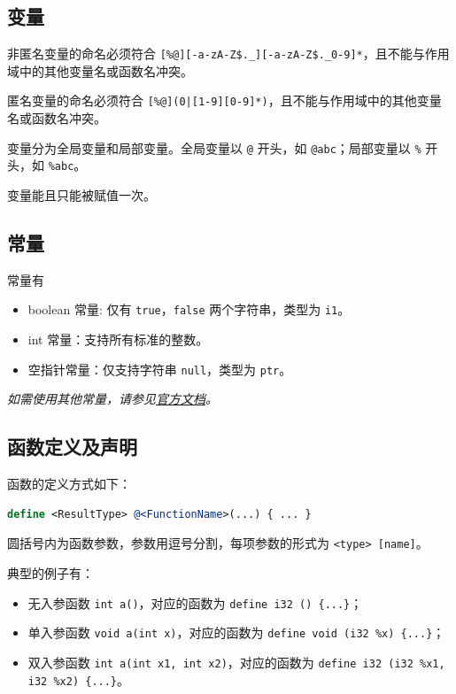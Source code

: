 \subsection{变量}\label{LLVM-variables}

非匿名变量的命名必须符合 \texttt{[\%@][-a-zA-Z\$.\_][-a-zA-Z\$.\_0-9]*}，且不能与作用域中的其他变量名或函数名冲突。

匿名变量的命名必须符合 \texttt{[\%@](0|[1-9][0-9]*)}，且不能与作用域中的其他变量名或函数名冲突。

变量分为全局变量和局部变量。全局变量以 \texttt @ 开头，如 \texttt{@abc}；局部变量以 \texttt \% 开头，如 \texttt{\%abc}。

变量能且只能被赋值一次。

\subsection{常量}\label{LLVM-constants}

常量有
\begin{itemize}
  \item boolean 常量: 仅有 \texttt{true}，\texttt{false} 两个字符串，类型为 \texttt{i1}。
  \item int 常量：支持所有标准的整数。
  \item 空指针常量：仅支持字符串 \texttt{null}，类型为 \texttt{ptr}。
\end{itemize}

\textit{如需使用其他常量，请参见\href{https://llvm.org/docs/LangRef.html\#constants}{官方文档}。}

\subsection{函数定义及声明}\label{LLVM-functions}

函数的定义方式如下：

\begin{lstlisting}[language=llvm]
define <ResultType> @<FunctionName>(...) { ... }
\end{lstlisting}

圆括号内为函数参数，参数用逗号分割，每项参数的形式为 \texttt{<type> [name]}。

典型的例子有：
\begin{itemize}
  \item 无入参函数 \texttt{int a()}，对应的函数为 \texttt{define i32 \@a() \{...\}}；
  \item 单入参函数 \texttt{void a(int x)}，对应的函数为 \texttt{define void \@a(i32 \%x) \{...\}}；
  \item 双入参函数 \texttt{int a(int x1, int x2)}，对应的函数为 \texttt{define i32 \@a(i32 \%x1, i32 \%x2) \{...\}}。
\end{itemize}

